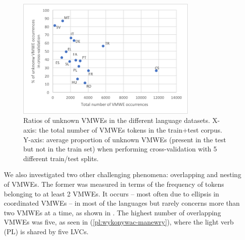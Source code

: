 \documentclass[output=paper,modfonts]{langscibook}
\begin{document}
\begin{figure}
\centering
\includegraphics[width=0.8\textwidth]{figures/parseme-st-2017-BOOK-CORPUS-chart-ratio-unk-all.png}
\caption{Ratios of unknown VMWEs in the different language datasets. X-axis: the total number of VMWEs tokens in the train+test corpus. Y-axis: average proportion of unknown VMWEs (present in the test but not in the train set) when performing %
cross-validation with 5 different train/test splits.}
\label{fig:unknown-ratios}
\end{figure}

We also investigated two other challenging phenomena: overlapping and nesting of VMWEs. The former was measured in terms of the frequency of tokens belonging to at least 2 VMWEs. It occurs -- most often due to ellipsis in coordinated VMWEs -- in most of the languages but rarely concerns more than two VMWEs at a time, as shown in . 
The highest number of overlapping VMWEs was five, as seen in (\ref{pl:wykonywac-manewry}), where the light verb (PL)  is shared by five LVCs.
\end{document}
